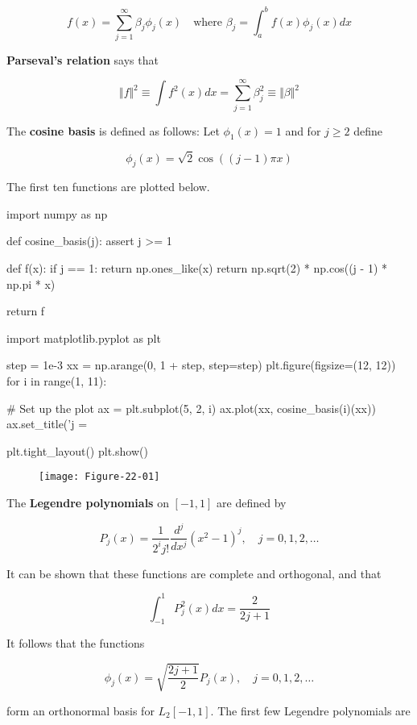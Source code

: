 \[ f(x) = \sum_{j=1}^{\infty} \beta_{j} \phi_{j}(x)
\quad \text{where } \beta_{j} = \int_a^{b} f(x) \phi_{j}(x) dx \]

\textbf{Parseval's relation} says that

\[ \Vert f \Vert^{2} \equiv \int f^{2}(x) dx = \sum_{j=1}^{\infty} \beta_{j}^{2} \equiv \Vert \beta \Vert^{2}\]

The \textbf{cosine basis} is defined as follows: Let \(\phi_{1}(x) = 1\)
and for \(j \geq 2\) define

\[\phi_{j}(x) = \sqrt{2} \cos \left( (j - 1) \pi x\right)\]

The first ten functions are plotted below.

\begin{python}
import numpy as np

def cosine_basis(j):
    assert j >= 1
    
    def f(x):
        if j == 1:
            return np.ones_like(x)   
        return np.sqrt(2) * np.cos((j - 1) * np.pi * x)
    
    return f
\end{python}

\begin{python}
import matplotlib.pyplot as plt

step = 1e-3
xx = np.arange(0, 1 + step, step=step)
plt.figure(figsize=(12, 12))
for i in range(1, 11):
    
    # Set up the plot
    ax = plt.subplot(5, 2, i)
    ax.plot(xx, cosine_basis(i)(xx))
    ax.set_title('j = %

plt.tight_layout()
plt.show()
\end{python}

\begin{figure}[H]
\centering
\texttt{[image: Figure-22-01]}
\end{figure}

The \textbf{Legendre polynomials} on \([-1, 1]\) are defined by

\[ P_{j}(x) = \frac{1}{2^{i} j!} \frac{d^{j}}{dx^{j}} (x^{2} - 1)^{j}, \quad j = 0, 1, 2, \dots \]

It can be shown that these functions are complete and orthogonal, and
that

\[ \int_{-1}^{1} P_{j}^{2}(x) dx = \frac{2}{2j + 1}\]

It follows that the functions

\[ \phi_{j}(x) = \sqrt{\frac{2j + 1}{2}}P_{j}(x), \quad j = 0, 1, 2, \dots \]

form an orthonormal basis for \(L_{2}[-1, 1]\). The first few Legendre
polynomials are

